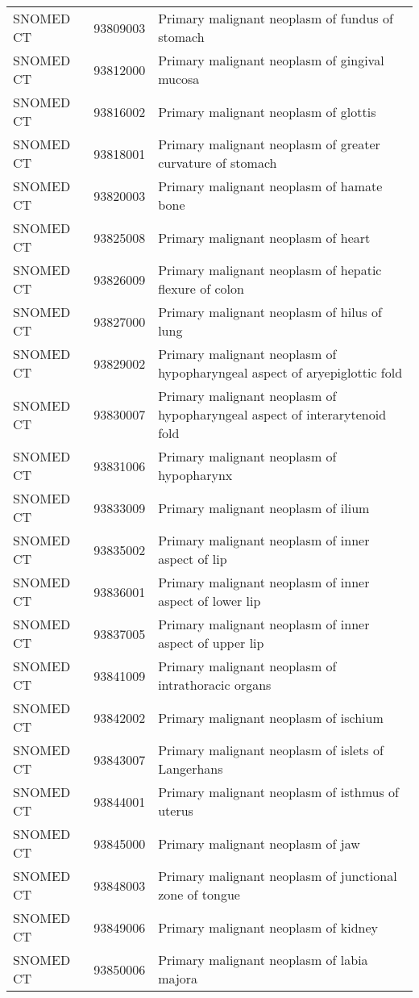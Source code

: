 \begin{longtable}{p{}p{}p{}}
  SNOMED CT & 93809003 & Primary malignant neoplasm of fundus of stomach \\ 
  SNOMED CT & 93812000 & Primary malignant neoplasm of gingival mucosa \\ 
  SNOMED CT & 93816002 & Primary malignant neoplasm of glottis \\ 
  SNOMED CT & 93818001 & Primary malignant neoplasm of greater curvature of stomach \\ 
  SNOMED CT & 93820003 & Primary malignant neoplasm of hamate bone \\ 
  SNOMED CT & 93825008 & Primary malignant neoplasm of heart \\ 
  SNOMED CT & 93826009 & Primary malignant neoplasm of hepatic flexure of colon \\ 
  SNOMED CT & 93827000 & Primary malignant neoplasm of hilus of lung \\ 
  SNOMED CT & 93829002 & Primary malignant neoplasm of hypopharyngeal aspect of aryepiglottic fold \\ 
  SNOMED CT & 93830007 & Primary malignant neoplasm of hypopharyngeal aspect of interarytenoid fold \\ 
  SNOMED CT & 93831006 & Primary malignant neoplasm of hypopharynx \\ 
  SNOMED CT & 93833009 & Primary malignant neoplasm of ilium \\ 
  SNOMED CT & 93835002 & Primary malignant neoplasm of inner aspect of lip \\ 
  SNOMED CT & 93836001 & Primary malignant neoplasm of inner aspect of lower lip \\ 
  SNOMED CT & 93837005 & Primary malignant neoplasm of inner aspect of upper lip \\ 
  SNOMED CT & 93841009 & Primary malignant neoplasm of intrathoracic organs \\ 
  SNOMED CT & 93842002 & Primary malignant neoplasm of ischium \\ 
  SNOMED CT & 93843007 & Primary malignant neoplasm of islets of Langerhans \\ 
  SNOMED CT & 93844001 & Primary malignant neoplasm of isthmus of uterus \\ 
  SNOMED CT & 93845000 & Primary malignant neoplasm of jaw \\ 
  SNOMED CT & 93848003 & Primary malignant neoplasm of junctional zone of tongue \\ 
  SNOMED CT & 93849006 & Primary malignant neoplasm of kidney \\ 
  SNOMED CT & 93850006 & Primary malignant neoplasm of labia majora \\ 

\end{longtable}
